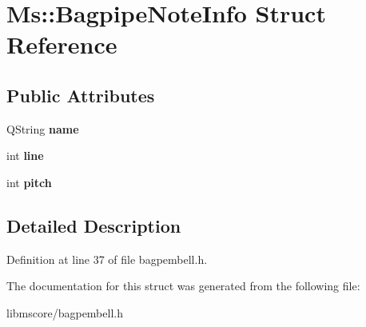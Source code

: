 \hypertarget{struct_ms_1_1_bagpipe_note_info}{}\section{Ms\+:\+:Bagpipe\+Note\+Info Struct Reference}
\label{struct_ms_1_1_bagpipe_note_info}
\subsection*{Public Attributes}
\begin{DoxyCompactItemize}
\item 
\mbox{\label{struct_ms_1_1_bagpipe_note_info_aaf6f3286fbd8d438128c6ec4dc8c7744}} 
Q\+String {\bfseries name}
\item 
\mbox{\label{struct_ms_1_1_bagpipe_note_info_a0453d94e69f93b70b4f6bbc6ab4a026e}} 
int {\bfseries line}
\item 
\mbox{\label{struct_ms_1_1_bagpipe_note_info_a6fdb5275581b19f87700d28ed213b170}} 
int {\bfseries pitch}
\end{DoxyCompactItemize}


\subsection{Detailed Description}


Definition at line 37 of file bagpembell.\+h.



The documentation for this struct was generated from the following file\+:\begin{DoxyCompactItemize}
\item 
libmscore/bagpembell.\+h\end{DoxyCompactItemize}
